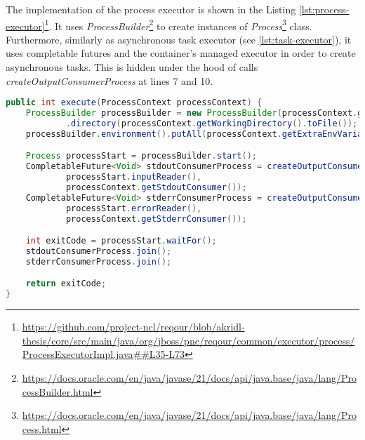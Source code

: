 \documentclass[../main.tex]{subfiles}
\begin{document}
The implementation of the process executor is shown in the Listing \ref{lst:process-executor}\footnote{\url{https://github.com/project-ncl/reqour/blob/akridl-thesis/core/src/main/java/org/jboss/pnc/reqour/common/executor/process/ProcessExecutorImpl.java##L35-L73}}. It uses \textit{ProcessBuilder}\footnote{\url{https://docs.oracle.com/en/java/javase/21/docs/api/java.base/java/lang/ProcessBuilder.html}} to create instances of \textit{Process}\footnote{\url{https://docs.oracle.com/en/java/javase/21/docs/api/java.base/java/lang/Process.html}} class. Furthermore, similarly as asynchronous task executor (see \ref{lst:task-executor}), it uses completable futures and the container's managed executor in order to create asynchronous tasks. This is hidden under the hood of calls \textit{createOutputConsumerProcess} at lines 7 and 10.

\begin{lstlisting}[language=Java, caption=Process executor implementation, label={lst:process-executor}]
public int execute(ProcessContext processContext) {
    ProcessBuilder processBuilder = new ProcessBuilder(processContext.getCommand())
            .directory(processContext.getWorkingDirectory().toFile());
    processBuilder.environment().putAll(processContext.getExtraEnvVariables());

    Process processStart = processBuilder.start();
    CompletableFuture<Void> stdoutConsumerProcess = createOutputConsumerProcess(
            processStart.inputReader(),
            processContext.getStdoutConsumer());
    CompletableFuture<Void> stderrConsumerProcess = createOutputConsumerProcess(
            processStart.errorReader(),
            processContext.getStderrConsumer());

    int exitCode = processStart.waitFor();
    stdoutConsumerProcess.join();
    stderrConsumerProcess.join();

    return exitCode;
}
\end{lstlisting}
\end{document}
